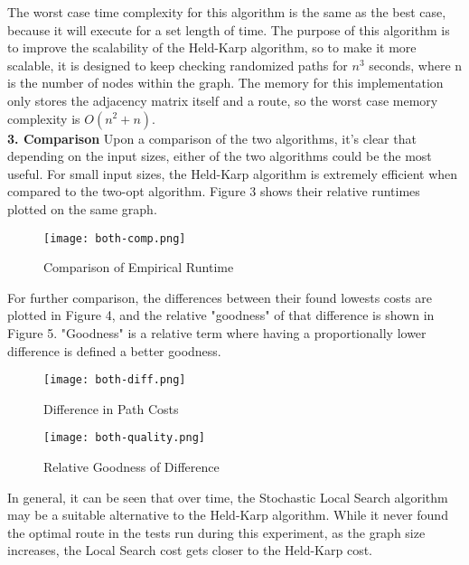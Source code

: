 The worst case time complexity for this algorithm is the same as the best case, because it will execute for a set length of time. The purpose of this algorithm is to improve the scalability of the Held-Karp algorithm, so to make it more scalable, it is designed to keep checking randomized paths for $n^3$ seconds, where n is the number of nodes within the graph. The memory for this implementation only stores the adjacency matrix itself and a route, so the worst case memory complexity is $O(n^2 + n)$. \\

\noindent\textbf{3. Comparison} Upon a comparison of the two algorithms, it's clear that depending on the input sizes, either of the two algorithms could be the most useful. For small input sizes, the Held-Karp algorithm is extremely efficient when compared to the two-opt algorithm. Figure 3 shows their relative runtimes plotted on the same graph.
\begin{figure}[h]
    \texttt{[image: both-comp.png]}
    \caption{Comparison of Empirical Runtime}
    \label{fig:both-comp}
\end{figure}
For further comparison, the differences between their found lowests costs are plotted in Figure 4, and the relative "goodness" of that difference is shown in Figure 5. "Goodness" is a relative term where having a proportionally lower difference is defined a better goodness.
\begin{figure}[tp]
    \texttt{[image: both-diff.png]}
    \caption{Difference in Path Costs}
    \label{fig:both-diff}
\end{figure}
\begin{figure}[bp]
    \texttt{[image: both-quality.png]}
    \caption{Relative Goodness of Difference}
    \label{fig:both-quality}
\end{figure}
In general, it can be seen that over time, the Stochastic Local Search algorithm may be a suitable alternative to the Held-Karp algorithm. While it never found the optimal route in the tests run during this experiment, as the graph size increases, the Local Search cost gets closer to the Held-Karp cost.

